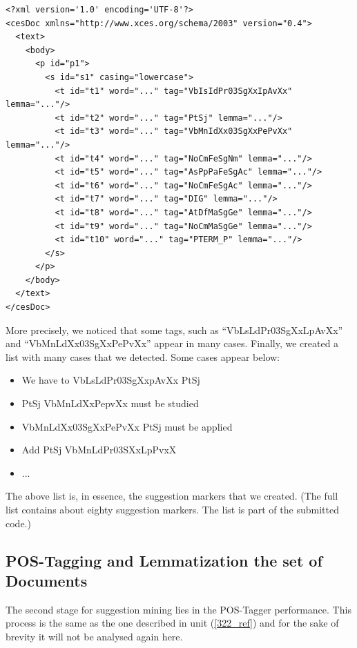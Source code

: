 \begin{lstlisting}[frame=single, basicstyle=\small]
<?xml version='1.0' encoding='UTF-8'?>
<cesDoc xmlns="http://www.xces.org/schema/2003" version="0.4">
  <text>
    <body>
      <p id="p1">
        <s id="s1" casing="lowercase">
          <t id="t1" word="..." tag="VbIsIdPr03SgXxIpAvXx" lemma="..."/>
          <t id="t2" word="..." tag="PtSj" lemma="..."/>
          <t id="t3" word="..." tag="VbMnIdXx03SgXxPePvXx" lemma="..."/>
          <t id="t4" word="..." tag="NoCmFeSgNm" lemma="..."/>
          <t id="t5" word="..." tag="AsPpPaFeSgAc" lemma="..."/>
          <t id="t6" word="..." tag="NoCmFeSgAc" lemma="..."/>
          <t id="t7" word="..." tag="DIG" lemma="..."/>
          <t id="t8" word="..." tag="AtDfMaSgGe" lemma="..."/>
          <t id="t9" word="..." tag="NoCmMaSgGe" lemma="..."/>
          <t id="t10" word="..." tag="PTERM_P" lemma="..."/>
        </s>
      </p>
    </body>
  </text>
</cesDoc>
\end{lstlisting}

More precisely, we noticed that some tags, such as ``VbLsLdPr03SgXxLpAvXx'' and ``VbMnLdXx03SgXxPePvXx'' appear in many cases. Finally, we created a list with many cases that we detected. Some cases appear below:\\

\begin{itemize}

	\item We have to VbLsLdPr03SgXxpAvXx PtSj
	\item PtSj VbMnLdXxPepvXx must be studied
	\item VbMnLdXx03SgXxPePvXx PtSj must be applied
	\item Add PtSj VbMnLdPr03SXxLpPvxX
	\item ...\\

\end{itemize}
The above list is, in essence, the suggestion markers that we created. (The full list contains about eighty suggestion markers. The list is part of the submitted code.)

\subsection{POS-Tagging and Lemmatization the set of Documents}\label{332_ref}
The second stage for suggestion mining lies in the POS-Tagger performance. This process is the same as the one described in unit (\ref{322_ref}) and for the sake of brevity it will not be analysed again here.

